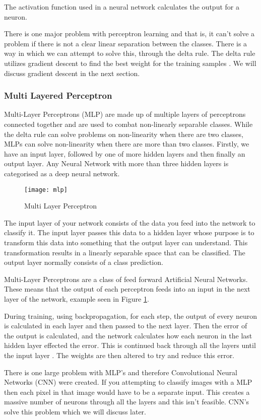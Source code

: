 The activation function used in a neural network calculates the output for a neuron.

There is one major problem with perceptron learning and that is, it can't solve
a problem if there is not a clear linear separation between the classes. There
is a way in which we can attempt to solve this, through the delta rule. The
delta rule utilizes gradient descent to find the best weight for the training
samples \parencite{MLANN}. We will discuss gradient descent in the next section.

\subsubsection*{Multi Layered Perceptron}
Multi-Layer Perceptrons (MLP) are made up of multiple layers of perceptrons connected
together and are used to combat non-linearly separable classes.
While the delta rule can solve problems on non-linearity when there are two classes, MLPs can solve non-linearity when there are more than two classes.
Firstly, we have an input layer, followed by one of more hidden layers and then
finally an output layer.
Any Neural Network with more than three hidden layers is categorised as a deep neural network.

\begin{figure}[h]
    \texttt{[image: mlp]}
     \caption{Multi Layer Perceptron}
     \label{fig:mlp}
\end{figure}

The input layer of your network consists of the data you feed into the network to classify it. The input layer passes this data to a hidden layer
whose purpose is to transform this data into something that the output layer can
understand. This transformation results in a linearly separable space that can be classified. The output layer normally consists of a class prediction.

Multi-Layer Perceptrons are a class of feed forward Artificial Neural Networks.
These means that the output of each perceptron feeds into an input in the next
layer of the network, example seen in Figure \ref{fig:mlp}.

During training, using backpropagation, for each step, the output of every neuron is calculated in each layer and then passed to the next layer. Then the error of the output is calculated, and the network calculates how each neuron in the last hidden layer effected the error. This is continued back through all the layers until the input layer \parencite{handsOnML}. The weights are then altered to try and reduce this error.

There is one large problem with MLP's and therefore Convolutional Neural
Networks (CNN) were created. If you attempting to classify images with a MLP then
each pixel in that image would have to be a separate input. This creates a
massive number of neurons through all the layers and this isn't feasible. CNN's
solve this problem which we will discuss later.

